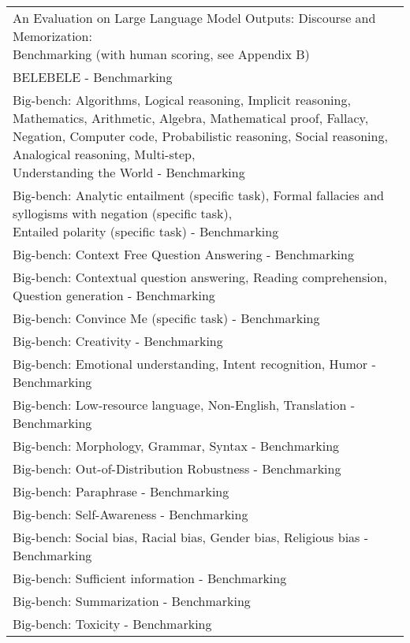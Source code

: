 \documentclass[fleqn]{article}
\begin{document}
\begin{table}[H]
\begin{tabular}{l}
		\midrule
		\makecell[l]{An Evaluation on Large Language Model Outputs: Discourse and Memorization:\\\hspace{10pt} Benchmarking (with human scoring, see Appendix B)} \\
		BELEBELE - Benchmarking \\
		\makecell[l]{Big-bench: Algorithms, Logical reasoning, Implicit reasoning, Mathematics, Arithmetic, Algebra, Mathematical proof, Fallacy,\\\hspace{10pt} Negation, Computer code, Probabilistic reasoning, Social reasoning, Analogical reasoning, Multi-step,\\\hspace{10pt} Understanding the World - Benchmarking} \\
		\makecell[l]{Big-bench: Analytic entailment (specific task), Formal fallacies and syllogisms with negation (specific task),\\\hspace{10pt}Entailed polarity (specific task) - Benchmarking} \\
		Big-bench: Context Free Question Answering - Benchmarking \\
		Big-bench: Contextual question answering, Reading comprehension, Question generation - Benchmarking \\
		Big-bench: Convince Me (specific task) - Benchmarking \\
		Big-bench: Creativity - Benchmarking \\
		Big-bench: Emotional understanding, Intent recognition, Humor - Benchmarking \\
		Big-bench: Low-resource language, Non-English, Translation - Benchmarking \\
		Big-bench: Morphology, Grammar, Syntax - Benchmarking \\
		Big-bench: Out-of-Distribution Robustness - Benchmarking \\
		Big-bench: Paraphrase - Benchmarking \\
		Big-bench: Self-Awareness - Benchmarking \\
		Big-bench: Social bias, Racial bias, Gender bias, Religious bias - Benchmarking \\
		Big-bench: Sufficient information - Benchmarking \\
		Big-bench: Summarization - Benchmarking \\
		Big-bench: Toxicity - Benchmarking \\

\end{tabular}
\end{table}
\end{document}
